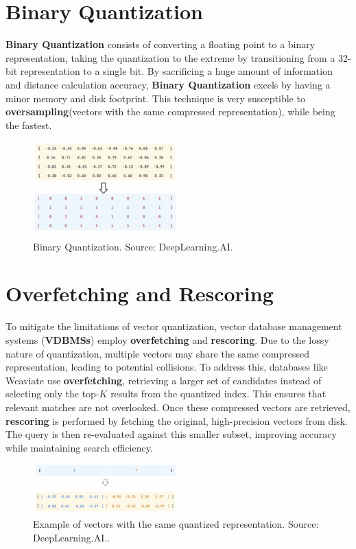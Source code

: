 \section{Binary Quantization}
\textbf{Binary Quantization} consists of converting a floating point to a binary representation, taking the quantization to the extreme by transitioning from a 32-bit representation to a single bit. By sacrificing a huge amount of information and distance calculation accuracy, \textbf{Binary Quantization} excels by having a minor memory and disk footprint. This technique is very susceptible to \textbf{oversampling}(vectors with the same compressed representation), while being the fastest.
\begin{figure}[h]
    \centering
\includegraphics[width=0.5\textwidth]{IMAGES/immagine_2025-02-27_123438887.png}
    \caption{Binary Quantization. Source: DeepLearning.AI.\footnotemark[1]}
    \label{fig:BQ}
\end{figure}

\section{Overfetching and Rescoring}
To mitigate the limitations of vector quantization, vector database management systems (\textbf{VDBMSs}) employ \textbf{overfetching} and \textbf{rescoring}. Due to the lossy nature of quantization, multiple vectors may share the same compressed representation, leading to potential collisions.
To address this, databases like Weaviate use \textbf{overfetching}, retrieving a larger set of candidates instead of selecting only the top-$K$ results from the quantized index. This ensures that relevant matches are not overlooked. Once these compressed vectors are retrieved, \textbf{rescoring} is performed by fetching the original, high-precision vectors from disk. The query is then re-evaluated against this smaller subset, improving accuracy while maintaining search efficiency.
\begin{figure}[h]
    \centering
\includegraphics[width=0.5\textwidth]{IMAGES/immagine_2025-02-27_123548078.png}
    \caption{Example of vectors with the same quantized representation. Source: DeepLearning.AI.\footnotemark.}
    \label{fig:Overfetching}
\end{figure}

